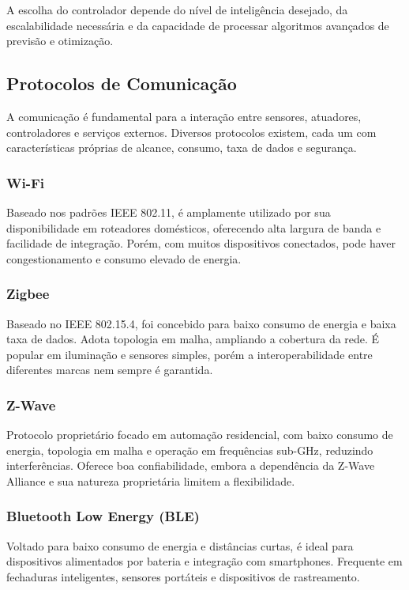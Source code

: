 A escolha do controlador depende do nível de inteligência desejado, da escalabilidade necessária e da capacidade de processar algoritmos avançados de previsão e otimização.

\subsection{Protocolos de Comunicação}

A comunicação é fundamental para a interação entre sensores, atuadores, controladores e serviços externos. Diversos protocolos existem, cada um com características próprias de alcance, consumo, taxa de dados e segurança.

\subsubsection{Wi-Fi}

Baseado nos padrões IEEE 802.11, é amplamente utilizado por sua disponibilidade em roteadores domésticos, oferecendo alta largura de banda e facilidade de integração. Porém, com muitos dispositivos conectados, pode haver congestionamento e consumo elevado de energia.

\subsubsection{Zigbee}

Baseado no IEEE 802.15.4, foi concebido para baixo consumo de energia e baixa taxa de dados. Adota topologia em malha, ampliando a cobertura da rede. É popular em iluminação e sensores simples, porém a interoperabilidade entre diferentes marcas nem sempre é garantida.

\subsubsection{Z-Wave}

Protocolo proprietário focado em automação residencial, com baixo consumo de energia, topologia em malha e operação em frequências sub-GHz, reduzindo interferências. Oferece boa confiabilidade, embora a dependência da Z-Wave Alliance e sua natureza proprietária limitem a flexibilidade.

\subsubsection{Bluetooth Low Energy (BLE)}

Voltado para baixo consumo de energia e distâncias curtas, é ideal para dispositivos alimentados por bateria e integração com smartphones. Frequente em fechaduras inteligentes, sensores portáteis e dispositivos de rastreamento.

